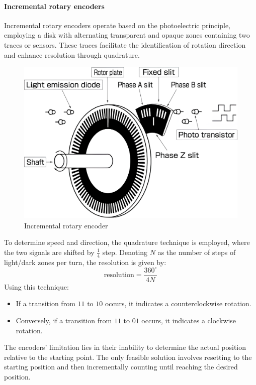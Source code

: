 \paragraph*{Incremental rotary encoders}
Incremental rotary encoders operate based on the photoelectric principle, employing a disk with alternating transparent and opaque zones containing two traces or sensors.
These traces facilitate the identification of rotation direction and enhance resolution through quadrature.
\begin{figure}[H]
    \centering
    \includegraphics[width=0.5\linewidth]{images/rotary1.png}
    \caption{Incremental rotary encoder}
\end{figure}
To determine speed and direction, the quadrature technique is employed, where the two signals are shifted by $\frac{1}{4}$ step. 
Denoting $N$ as the number of steps of light/dark zones per turn, the resolution is given by:
\[\text{resolution}=\dfrac{360^{\circ}}{4N}\]
Using this technique:
\begin{itemize}
    \item If a transition from $1 1$ to $1 0$ occurs, it indicates a counterclockwise rotation.
    \item Conversely, if a transition from $1 1$ to $0 1$ occurs, it indicates a clockwise rotation.
\end{itemize}

The encoders' limitation lies in their inability to determine the actual position relative to the starting point.
The only feasible solution involves resetting to the starting position and then incrementally counting until reaching the desired position.

